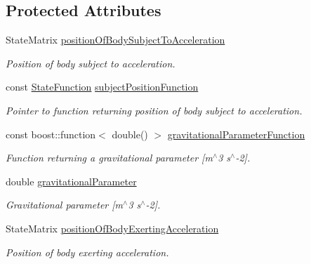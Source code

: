 \subsection*{Protected Attributes}
\begin{DoxyCompactItemize}
\item 
State\+Matrix \hyperlink{classtudat_1_1gravitation_1_1SphericalHarmonicsGravitationalAccelerationModelBase_a0e873e80f5b4654243def79fc89a8f9b}{position\+Of\+Body\+Subject\+To\+Acceleration}
\begin{DoxyCompactList}\small\item\em Position of body subject to acceleration. \end{DoxyCompactList}\item 
const \hyperlink{classtudat_1_1gravitation_1_1SphericalHarmonicsGravitationalAccelerationModelBase_a4ca706c4f941be481fc5f490e49390d8}{State\+Function} \hyperlink{classtudat_1_1gravitation_1_1SphericalHarmonicsGravitationalAccelerationModelBase_a302efd9e7b078e67f3d475e613c96da1}{subject\+Position\+Function}
\begin{DoxyCompactList}\small\item\em Pointer to function returning position of body subject to acceleration. \end{DoxyCompactList}\item 
const boost\+::function$<$ double() $>$ \hyperlink{classtudat_1_1gravitation_1_1SphericalHarmonicsGravitationalAccelerationModelBase_a858ce486036b01aa152cea22561210ae}{gravitational\+Parameter\+Function}
\begin{DoxyCompactList}\small\item\em Function returning a gravitational parameter \mbox{[}m$^\wedge$3 s$^\wedge$-\/2\mbox{]}. \end{DoxyCompactList}\item 
double \hyperlink{classtudat_1_1gravitation_1_1SphericalHarmonicsGravitationalAccelerationModelBase_a6324fd00981daa580fab84e579de285f}{gravitational\+Parameter}
\begin{DoxyCompactList}\small\item\em Gravitational parameter \mbox{[}m$^\wedge$3 s$^\wedge$-\/2\mbox{]}. \end{DoxyCompactList}\item 
State\+Matrix \hyperlink{classtudat_1_1gravitation_1_1SphericalHarmonicsGravitationalAccelerationModelBase_a7025348306abb91a3dd47a8583518de8}{position\+Of\+Body\+Exerting\+Acceleration}
\begin{DoxyCompactList}\small\item\em Position of body exerting acceleration. \end{DoxyCompactList}\item 

\end{DoxyCompactItemize}
